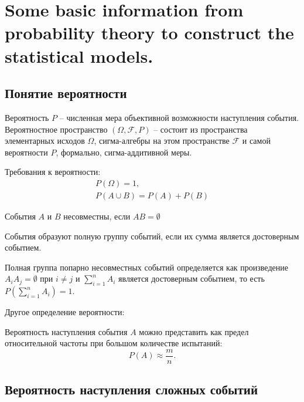 \section{Some basic information from probability theory to construct the statistical models.}

\subsection*{Понятие вероятности}
\begin{definition}{}{}
    Вероятность $P$ -- численная мера объективной возможности наступления события. Вероятностное пространство $\left(\Omega,\mathcal{F}, P\right)$ -- состоит из пространства элементарных исходов $\Omega$, сигма-алгебры на этом пространстве $\mathcal{F}$ и самой вероятности $P$, формально, сигма-аддитивной меры.
\end{definition}
\begin{note}{}{}
    Требования к вероятности:
    \[
        \begin{array}{c}
          P(\Omega) = 1,\\
          P(A \cup B) = P(A) + P(B)  
        \end{array}  
    \]
\end{note}
\begin{definition}{}{}
    События $A$ и $B$ несовместны, если $AB = \emptyset$
\end{definition}
\begin{definition}{}{}
    События образуют полную группу событий, если их сумма является достоверным событием.
\end{definition}

\begin{definition}{}{}
    Полная группа попарно несовместных событий определяется как произведение $A_iA_j = \emptyset$ при $i\neq j$ и $\sum\limits_{i=1}^n A_i$ является достоверным событием, то есть $P\left(\sum\limits_{i=1}^n A_i\right) = 1.$
\end{definition}

\par
Другое определение вероятности:
\begin{definition}{}{}
    Вероятность наступления события $A$ можно представить как предел относительной частоты при большом количестве испытаний:
    \[
        P(A) \approx \dfrac{m}{n}.  
    \]
\end{definition}
\subsection*{Вероятность наступления сложных событий}

